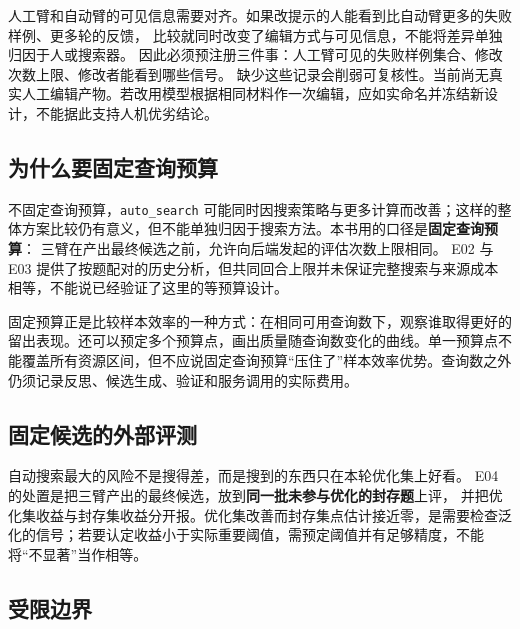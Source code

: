 人工臂和自动臂的可见信息需要对齐。如果改提示的人能看到比自动臂更多的失败样例、更多轮的反馈，
比较就同时改变了编辑方式与可见信息，不能将差异单独归因于人或搜索器。
因此必须预注册三件事：人工臂可见的失败样例集合、修改次数上限、修改者能看到哪些信号。
缺少这些记录会削弱可复核性。当前尚无真实人工编辑产物。若改用模型根据相同材料作一次编辑，应如实命名并冻结新设计，不能据此支持人机优劣结论。

\subsection*{为什么要固定查询预算}

不固定查询预算，\texttt{auto\_search} 可能同时因搜索策略与更多计算而改善；这样的整体方案比较仍有意义，但不能单独归因于搜索方法。本书用的口径是\textbf{固定查询预算}：
三臂在产出最终候选之前，允许向后端发起的评估次数上限相同。
E02 与 E03 提供了按题配对的历史分析，但共同回合上限并未保证完整搜索与来源成本相等，不能说已经验证了这里的等预算设计。

固定预算正是比较样本效率的一种方式：在相同可用查询数下，观察谁取得更好的留出表现。还可以预定多个预算点，画出质量随查询数变化的曲线。单一预算点不能覆盖所有资源区间，但不应说固定查询预算“压住了”样本效率优势。查询数之外仍须记录反思、候选生成、验证和服务调用的实际费用。

\subsection*{固定候选的外部评测}

自动搜索最大的风险不是搜得差，而是搜到的东西只在本轮优化集上好看。
E04 的处置是把三臂产出的最终候选，放到\textbf{同一批未参与优化的封存题}上评，
并把优化集收益与封存集收益分开报。优化集改善而封存集点估计接近零，是需要检查泛化的信号；若要认定收益小于实际重要阈值，需预定阈值并有足够精度，不能将“不显著”当作相等。

\subsection*{受限边界}


